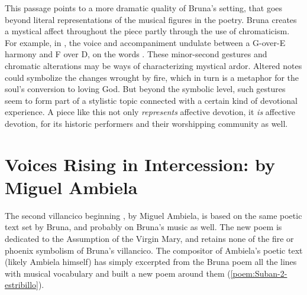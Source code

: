 This passage points to a more dramatic quality of Bruna's setting, that goes beyond literal representations of the musical figures in the poetry.
Bruna creates a mystical affect throughout the piece partly through the use of chromaticism.
For example, in , the voice and accompaniment undulate between a G-over-E\fl{} harmony and F\sh{} over D, on the words .
These minor-second gestures and chromatic alterations may be ways of characterizing mystical ardor.
Altered notes could symbolize the changes wrought by fire, which in turn is a metaphor for the soul's conversion to loving God.
But beyond the symbolic level, such gestures seem to form part of a stylistic topic connected with a certain kind of devotional experience.
A piece like this not only \emph{represents} affective devotion, it \emph{is} affective devotion, for its historic performers and their worshipping community as well.

\section{%
Voices Rising in Intercession: 
 by Miguel Ambiela
}


The second villancico beginning , by Miguel Ambiela, is based on the same poetic text set by Bruna, and probably on Bruna's music as well.
The new poem is dedicated to the Assumption of the Virgin Mary, and retains none of the fire or phoenix symbolism of Bruna's villancico.
The compositor of Ambiela's poetic text (likely Ambiela himself) has simply excerpted from the Bruna poem all the lines with musical vocabulary and built a new poem around them (\cref{poem:Suban-2-estribillo}).

% 	

